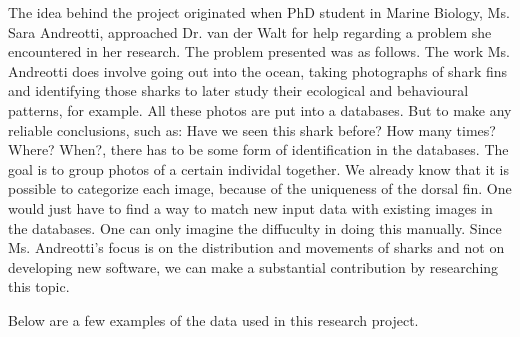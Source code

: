 \documentclass[a4paper,10pt]{article}
\begin{document}
The idea behind the project originated when PhD
student in Marine Biology, Ms. Sara Andreotti, approached Dr. van der Walt for
help regarding a problem she encountered in her research.
The problem presented was
as follows.  The work Ms. Andreotti does involve going out into the ocean,
taking photographs of shark fins and identifying those sharks to later study their ecological and behavioural
patterns, for example.
All these photos are put into a databases. But to
make any reliable conclusions, such as: Have we seen this shark before?  How
many
times? Where? When?, there has to be some form of identification in the
databases. 
The goal is to group photos of a certain individal together.  We
already know that it is possible to categorize each image, because of the
uniqueness of the dorsal fin.  One would just have to find a way to match new
input data with existing images in the databases.  One can only imagine the
diffuculty in doing this manually. 
Since Ms. Andreotti's
focus is on the distribution and movements of sharks and not on developing new
software, we can make a substantial contribution by researching this topic. 

Below are a few examples of the data used in this research project.

\begin{figure}[H]
\centering
\mbox{ \quad
{} \quad
{}}
\end{figure}
\end{document}
